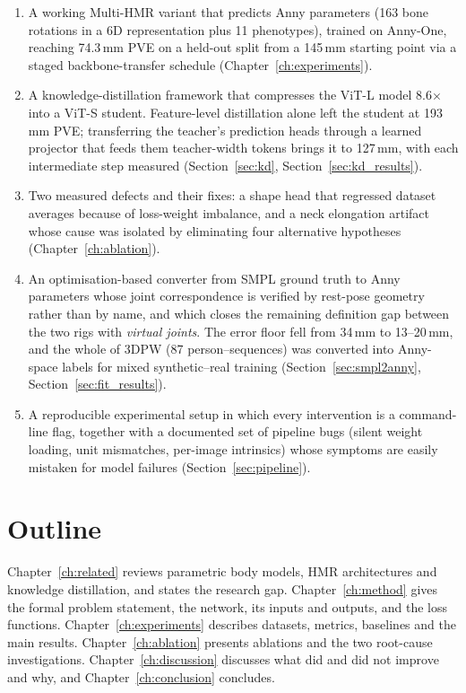 \begin{enumerate}
  \item A working Multi-HMR variant that predicts Anny parameters (163 bone
        rotations in a 6D representation plus 11 phenotypes), trained on
        Anny-One, reaching 74.3\,mm PVE on a held-out split from a 145\,mm
        starting point via a staged backbone-transfer schedule
        (Chapter~\ref{ch:experiments}).
  \item A knowledge-distillation framework that compresses the ViT-L model
        8.6$\times$ into a ViT-S student. Feature-level distillation alone
        left the student at 193\,mm PVE; transferring the teacher's prediction
        heads through a learned projector that feeds them teacher-width tokens
        brings it to 127\,mm, with each intermediate step measured
        (Section~\ref{sec:kd}, Section~\ref{sec:kd_results}).
  \item Two measured defects and their fixes: a shape head that regressed
        dataset averages because of loss-weight imbalance, and a neck
        elongation artifact whose cause was isolated by eliminating four
        alternative hypotheses (Chapter~\ref{ch:ablation}).
  \item An optimisation-based converter from SMPL ground truth to Anny
        parameters whose joint correspondence is verified by rest-pose
        geometry rather than by name, and which closes the remaining
        definition gap between the two rigs with \emph{virtual joints}. The
        error floor fell from 34\,mm to 13--20\,mm, and the whole of 3DPW
        (87 person--sequences) was converted into Anny-space labels for mixed
        synthetic--real training (Section~\ref{sec:smpl2anny},
        Section~\ref{sec:fit_results}).
  \item A reproducible experimental setup in which every intervention is a
        command-line flag, together with a documented set of pipeline bugs
        (silent weight loading, unit mismatches, per-image intrinsics) whose
        symptoms are easily mistaken for model failures
        (Section~\ref{sec:pipeline}).
\end{enumerate}

\section{Outline}

Chapter~\ref{ch:related} reviews parametric body models, HMR architectures and
knowledge distillation, and states the research gap. Chapter~\ref{ch:method}
gives the formal problem statement, the network, its inputs and outputs, and the
loss functions. Chapter~\ref{ch:experiments} describes datasets, metrics,
baselines and the main results. Chapter~\ref{ch:ablation} presents ablations
and the two root-cause investigations. Chapter~\ref{ch:discussion} discusses
what did and did not improve and why, and Chapter~\ref{ch:conclusion} concludes.

